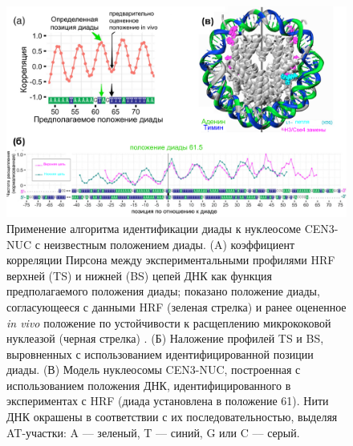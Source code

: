\begin{figure}[H]
    \centering
    \includegraphics[width=\textwidth]{images/p5/part5_2_nar/p5_2_f8.pdf}
    \caption[Применение алгоритма идентификации диады  к нуклеосоме CEN3-NUC с неизвестным положением диады.]{Применение алгоритма идентификации диады  к нуклеосоме CEN3-NUC с неизвестным положением диады. (A) коэффициент корреляции Пирсона между экспериментальными профилями HRF верхней (TS) и нижней (BS) цепей ДНК как функция предполагаемого положения диады; показано положение диады, согласующееся с данными HRF (зеленая стрелка) и ранее оцененное \textit{in vivo} положение по устойчивости к расщеплению микрококовой нуклеазой (черная стрелка) \cite{cole_centromeric_2011}. (Б) Наложение профилей TS и BS, выровненных с использованием идентифицированной позиции диады. (В) Модель нуклеосомы CEN3-NUC, построенная с использованием положения ДНК, идентифицированного в экспериментах с HRF (диада установлена в положение 61). Нити ДНК окрашены в соответствии с их последовательностью, выделяя AT-участки: A –– зеленый, T –– синий, G или C –– серый.}
    \label{fig:p5:p5_2_f8}
\end{figure}



